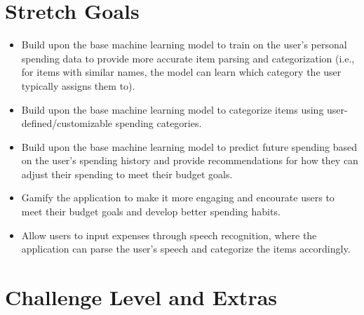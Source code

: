 \documentclass{article}
\begin{document}
\section{Stretch Goals}
\begin{itemize}
    \item Build upon the base machine learning model to train on the user's personal spending data to provide more accurate item parsing and categorization (i.e., for items with similar names, the model can learn which category the user typically assigns them to).
    \item Build upon the base machine learning model to categorize items using user-defined/customizable spending categories.
    \item Build upon the base machine learning model to predict future spending based on the user's spending history and provide recommendations for how they can adjust their spending to meet their budget goals.
    \item Gamify the application to make it more engaging and encourate users to meet their budget goals and develop better spending habits.
    \item Allow users to input expenses through speech recognition, where the application can parse the user's speech and categorize the items accordingly.
\end{itemize}

\section{Challenge Level and Extras}


\end{document}
